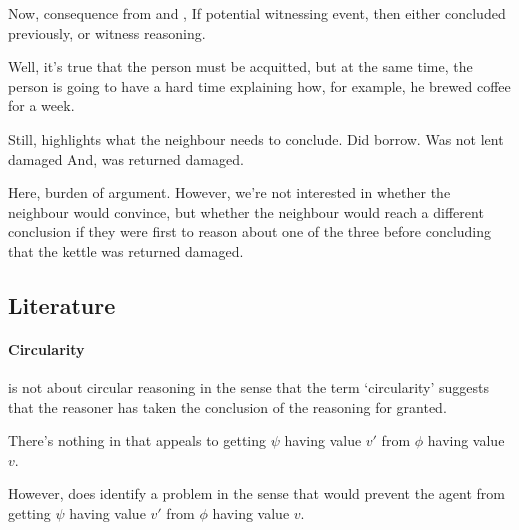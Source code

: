 \begin{note}
  Now, consequence from \ideaCS{} and \ESU{},
  If potential witnessing event, then either concluded previously, or witness reasoning.
\end{note}

\begin{note}
  Well, it's true that the person must be acquitted, but at the same time, the person is going to have a hard time explaining how, for example, he brewed coffee for a week.

  Still, highlights what the neighbour needs to conclude.
  Did borrow.
  Was not lent damaged
  And, was returned damaged.

  Here, burden of argument.
  However, we're not interested in whether the neighbour would convince, but whether the neighbour would reach a different conclusion if they were first to reason about one of the three before concluding that the kettle was returned damaged.
\end{note}

\subsection{Literature}
\label{sec:zS:literature}

\paragraph{Circularity}

\begin{note}
  \ideaCS{} is not about circular reasoning in the sense that the term `circularity' suggests that the reasoner has taken the conclusion of the reasoning for granted.

  There's nothing in \ideaCS{} that appeals to getting \(\psi\) having value \(v'\) from \(\phi\) having value \(v\).

  However, does identify a problem in the sense that would prevent the agent from getting \(\psi\) having value \(v'\) from \(\phi\) having value \(v\).
\end{note}


